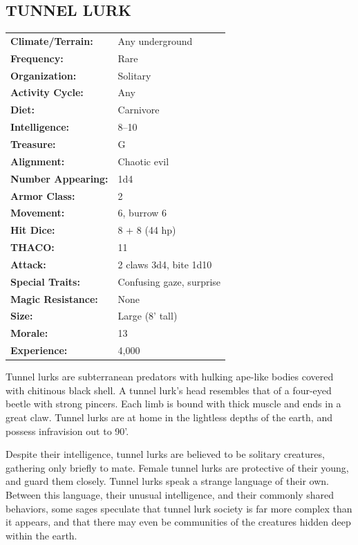 \begin{multicols}{2}
\begin{minipage}{\columnwidth}
\subsection{TUNNEL LURK}

\noindent \begin{tabular}{p{}p{}}
\textbf{Climate/Terrain:}	& Any underground	\\
\textbf{Frequency:} 		& Rare	\\
\textbf{Organization:} 		& Solitary	\\
\textbf{Activity Cycle:} 	& Any	\\
\textbf{Diet:} 				& Carnivore	\\
\textbf{Intelligence:} 		& 8--10	\\
\textbf{Treasure:} 			& G	\\
\textbf{Alignment:} 		& Chaotic evil	\\
\hline
\textbf{Number Appearing:} 	& 1d4	\\
\textbf{Armor Class:} 		& 2	\\
\textbf{Movement:} 			& 6, burrow 6	\\
\textbf{Hit Dice:} 			& 8 + 8 (44 hp)	\\
\textbf{THACO:} 			& 11	\\
\textbf{Attack:} 			& 2 claws 3d4, bite 1d10	\\
\textbf{Special Traits:} & Confusing gaze, surprise	\\
\textbf{Magic Resistance:} 	& None	\\
\textbf{Size:} 				& Large (8' tall)	\\
\textbf{Morale:} 			& 13	\\
\textbf{Experience:} 		& 4,000	\\
\end{tabular}

\end{minipage}

Tunnel lurks are subterranean predators with hulking ape-like bodies covered with chitinous black shell. A tunnel lurk's head resembles that of a four-eyed beetle with strong pincers. Each limb is bound with thick muscle and ends in a great claw. Tunnel lurks are at home in the lightless depths of the earth, and possess infravision out to 90'.

Despite their intelligence, tunnel lurks are believed to be solitary creatures, gathering only briefly to mate. Female tunnel lurks are protective of their young, and guard them closely. Tunnel lurks speak a strange language of their own. Between this language, their unusual intelligence, and their commonly shared behaviors, some sages speculate that tunnel lurk society is far more complex than it appears, and that there may even be communities of the creatures hidden deep within the earth.


\end{multicols}
